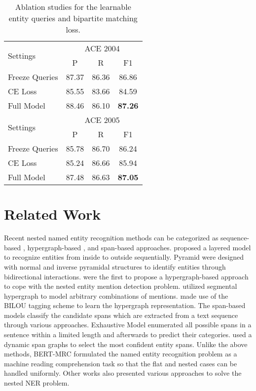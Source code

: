 \documentclass{article}
\begin{document}
\begin{table}
\centering
\begin{tabular}{lccc}
\toprule
\multirow{2}{*}{Settings} & \multicolumn{3}{c}{ACE 2004}  \\
\cmidrule(lr){2-4}
  & P  & R & F1  \\
\midrule
Freeze Queries     & 87.37  & 86.36 & 86.86  \\
CE Loss            & 85.55  & 83.66 & 84.59  \\
Full Model         & 88.46  & 86.10  & \textbf{87.26}  \\
\bottomrule
\toprule
\multirow{2}{*}{Settings} & \multicolumn{3}{c}{ACE 2005}  \\
\cmidrule(lr){2-4}
  & P  & R & F1  \\
\midrule
 Freeze Queries     & 85.78 & 86.70 & 86.24  \\
 CE Loss            & 85.24  & 86.66 & 85.94  \\
 Full Model         & 87.48 & 86.63 & \textbf{87.05}  \\

\bottomrule

\end{tabular}
\caption{Ablation studies for the learnable entity queries and bipartite matching loss.}
\label{tab:ablation_}
\end{table}


\section{Related Work}
Recent nested named entity recognition methods can be categorized as sequence-based \cite{ju2018neural,jue2020pyramid}, hypergraph-based \cite{lu2015joint,wang2018neural,katiyar2018nested}, and span-based \cite{xu2017local,sohrab2018deep,zheng2019boundary,yu2020named} approaches. \citep{ju2018neural} proposed a layered model to recognize entities from inside to outside sequentially. Pyramid \cite{jue2020pyramid} were designed with normal and inverse pyramidal structures to identify entities through bidirectional interactions. \citep{lu2015joint} were the first to propose a hypergraph-based approach to cope with the nested entity mention detection problem. \citep{wang2018neural} utilized segmental hypergraph to model arbitrary combinations of mentions. \citep{katiyar2018nested} made use of the BILOU tagging scheme to learn the hypergraph representation.  The span-based models classify the candidate spans which are extracted from a text sequence through various approaches. Exhaustive Model \cite{sohrab2018deep} enumerated all possible spans in a sentence within a limited length and afterwards to predict their categories. \citep{luan2019general} used a dynamic span graphs to select the most confident entity spans.  Unlike the above methods, BERT-MRC \cite{li-etal-2020-unified} formulated the named entity recognition problem as a machine reading comprehension task so that the flat and nested cases can be handled uniformly. Other works \cite{lin2019sequence,fisher2019merge,strakova2019neural}  also presented various approaches to solve the nested NER problem.
\end{document}
